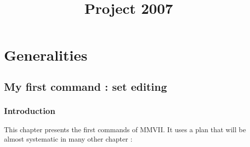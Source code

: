 \documentclass[a4paper]{book}
\newcommand{\PPP}{MMVII}
\begin{document}

\title{Project 2007}

\maketitle

\tableofcontents



\part{Generalities}



\chapter{My first command : set editing}


\section{Introduction}

This chapter presents the first commands of \PPP . It uses a plan that will be almost
systematic in many other chapter :
\end{document}
